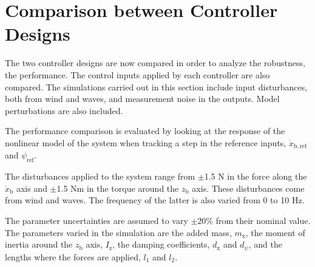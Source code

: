 \section{Comparison between Controller Designs}\label{sec:comparison}
The two controller designs are now compared in order to analyze the robustness, the performance. The control inputs applied by each controller are also compared. The simulations carried out in this section include input disturbances, both from wind and waves, and measurement noise in the outputs. Model perturbations are also included.

The performance comparison is evaluated by looking at the response of the nonlinear model of the system when tracking a step in the reference inputs, $\dot{x}_\mathrm{b,ref}$ and $\psi_\mathrm{ref}$. 

The disturbances applied to the system range from $\pm$\num{1.5} N in the force along the $\dot{x}_\mathrm{b}$ axis and $\pm$\num{1.5} Nm in the torque around the $z_\mathrm{b}$ axis. These disturbances come from wind and waves. The frequency of the latter is also varied from 0 to 10 Hz.

The parameter uncertainties are assumed to vary $\pm$20\% from their nominal value. The parameters varied in the simulation are the added mass, $m_\mathrm{x}$, the moment of inertia around the $z_\mathrm{b}$ axis, $I_\mathrm{z}$, the damping coefficients, $d_\mathrm{x}$ and $d_\psi$, and the lengths where the forces are applied, $l_1$ and $l_2$. 

